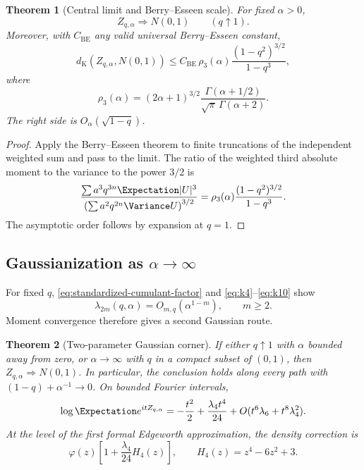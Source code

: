 \documentclass[11pt]{article}
\newtheorem{theorem}{Theorem}[section]
\theoremstyle{definition}
\theoremstyle{remark}
\begin{document}
\begin{theorem}[Central limit and Berry--Esseen scale]
\label{thm:CLT-q}
For fixed \(\alpha>0\),
\begin{equation}
 Z_{q,\alpha}\Rightarrow N(0,1)\qquad(q\uparrow1).
 \label{eq:q-CLT}
\end{equation}
Moreover, with \(C_{\mathrm{BE}}\) any valid universal Berry--Esseen constant,
\begin{equation}
 d_{\mathrm K}(Z_{q,\alpha},N(0,1))
 \le C_{\mathrm{BE}}\,
 \rho_3(\alpha)\frac{(1-q^2)^{3/2}}{1-q^3},
 \label{eq:berry-esseen}
\end{equation}
where
\begin{equation}
 \rho_3(\alpha)
 =(2\alpha+1)^{3/2}
 \frac{\Gamma(\alpha+1/2)}{\sqrt\pi\,\Gamma(\alpha+2)}.
 \label{eq:rho3}
\end{equation}
The right side is \(O_\alpha(\sqrt{1-q})\).
\end{theorem}

\begin{proof}
Apply the Berry--Esseen theorem \cite{Petrov,BhattacharyaRao} to finite truncations of the independent weighted sum and
pass to the limit.  The ratio of the weighted third absolute moment to the
variance to the power \(3/2\) is
\[
 \frac{\sum a^3q^{3n}\Expectation|U|^3}
 {\left(\sum a^2q^{2n}\Variance U\right)^{3/2}}
 =\rho_3(\alpha)\frac{(1-q^2)^{3/2}}{1-q^3}.
\]
The asymptotic order follows by expansion at \(q=1\).
\end{proof}

\subsection{Gaussianization as \(\alpha\to\infty\)}

For fixed \(q\), \eqref{eq:standardized-cumulant-factor} and
\eqref{eq:k4}--\eqref{eq:k10} show
\begin{equation}
 \lambda_{2m}(q,\alpha)=O_{m,q}(\alpha^{1-m}),\qquad m\ge2.
 \label{eq:alpha-cumulant-decay}
\end{equation}
Moment convergence therefore gives a second Gaussian route.

\begin{theorem}[Two-parameter Gaussian corner]
\label{thm:two-parameter-gaussian}
If either \(q\uparrow1\) with \(\alpha\) bounded away from zero, or
\(\alpha\to\infty\) with \(q\) in a compact subset of \((0,1)\), then
\(Z_{q,\alpha}\Rightarrow N(0,1)\).  In particular, the conclusion holds
along every path with \((1-q)+\alpha^{-1}\to0\).  On bounded Fourier
intervals,
\begin{equation}
 \log\Expectation e^{itZ_{q,\alpha}}
 =-\frac{t^2}{2}+\frac{\lambda_4t^4}{24}+O(t^6\lambda_6+t^8\lambda_4^2).
 \label{eq:mod-gaussian}
\end{equation}
At the level of the first formal Edgeworth approximation, the density correction is
\begin{equation}
 \varphi(z)\left[1+\frac{\lambda_4}{24}H_4(z)\right],
 \qquad H_4(z)=z^4-6z^2+3.
 \label{eq:edgeworth}
\end{equation}
\end{theorem}
\end{document}
